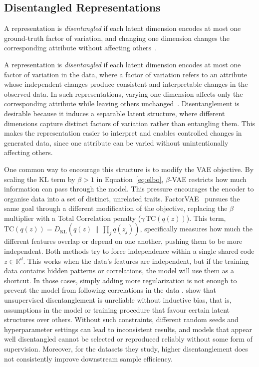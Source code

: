 \subsection{Disentangled Representations}

A representation is \emph{disentangled} if each latent dimension encodes at most one
ground-truth factor of variation, and changing one dimension changes the corresponding
attribute without affecting others~\citep{disentengaled_representation_learning,
on_disentangled_representation_learning}. 

A representation is \emph{disentangled} if each latent dimension encodes at most one factor of variation in the data, where a factor of variation refers to an attribute whose independent changes produce consistent and interpretable changes in the observed data. 
In such representations, varying one dimension affects only the corresponding attribute while leaving others unchanged~\citep{disentengaled_representation_learning, on_disentangled_representation_learning}.
Disentanglement is desirable because it induces a separable latent structure, where different dimensions capture distinct factors of variation rather than entangling them. 
This makes the representation easier to interpret and enables controlled changes in generated data, since one attribute can be varied without unintentionally affecting others.


One common way to encourage this structure is to modify the VAE objective. 
By scaling the KL term by $\beta > 1$ in Equation~\ref{eq:elbo}, $\beta$-VAE \citep{Higgins2016betaVAELB} restricts how much information can pass through the model. 
This pressure encourages the encoder to organise data into a set of distinct, unrelated traits.
FactorVAE~\citep{disentangling_by_factorising} pursues the same goal through a different modification of the objective, replacing the $\beta$ multiplier with a Total Correlation penalty ($\gamma\,\mathrm{TC}(q(z))$).
This term, $\mathrm{TC}(q(z)) = D_{\mathrm{KL}}(q(z)\,\|\,\prod_j q(z_j))$, specifically measures how much the different features overlap or depend on one another, pushing them to be more independent.
Both methods try to force independence within a single shared code $z \in \mathbb{R}^d$. 
This works when the data's features are independent, but if the training data contains hidden patterns or correlations, the model will use them as a shortcut. 
In those cases, simply adding more regularization is not enough to prevent the model from following correlations in the data \citep{challeau2019challenging}. 
\citet{challeau2019challenging} show that unsupervised disentanglement is unreliable without inductive bias, that is, assumptions in the model or training procedure that favour certain latent structures over others. 
Without such constraints, different random seeds and hyperparameter settings can lead to inconsistent results, and models that appear well disentangled cannot be selected or reproduced reliably without some form of supervision. 
Moreover, for the datasets they study, higher disentanglement does not consistently improve downstream sample efficiency. 

